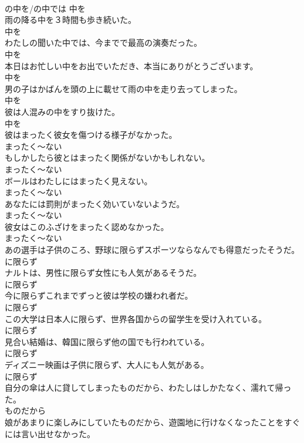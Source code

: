\documentclass[8pt]{extreport}
\begin{document}
\begin{CJK}{UTF8}{min}
\\	の中を/の中では	中を
\\	雨の降る中を３時間も歩き続いた。	
\\	中を
\\	わたしの聞いた中では、今までで最高の演奏だった。	
\\	中を
\\	本日はお忙しい中をお出でいただき、本当にありがとうございます。	
\\	中を
\\	男の子はかばんを頭の上に載せて雨の中を走り去ってしまった。	
\\	中を
\\	彼は人混みの中をすり抜けた。	
\\	中を
\\	彼はまったく彼女を傷つける様子がなかった。	
\\	まったく～ない
\\	もしかしたら彼とはまったく関係がないかもしれない。	
\\	まったく～ない
\\	ボールはわたしにはまったく見えない。	
\\	まったく～ない
\\	あなたには罰則がまったく効いていないようだ。	
\\	まったく～ない
\\	彼女はこのふざけをまったく認めなかった。	
\\	まったく～ない
\\	あの選手は子供のころ、野球に限らずスポーツならなんでも得意だったそうだ。	
\\	に限らず
\\	ナルトは、男性に限らず女性にも人気があるそうだ。	
\\	に限らず
\\	今に限らずこれまでずっと彼は学校の嫌われ者だ。	
\\	に限らず
\\	この大学は日本人に限らず、世界各国からの留学生を受け入れている。	
\\	に限らず
\\	見合い結婚は、韓国に限らず他の国でも行われている。	
\\	に限らず
\\	ディズニー映画は子供に限らず、大人にも人気がある。	
\\	に限らず
\\	自分の傘は人に貸してしまったものだから、わたしはしかたなく、濡れて帰った。	
\\	ものだから
\\	娘があまりに楽しみにしていたものだから、遊園地に行けなくなったことをすぐには言い出せなかった。	

\end{CJK}
\end{document}
